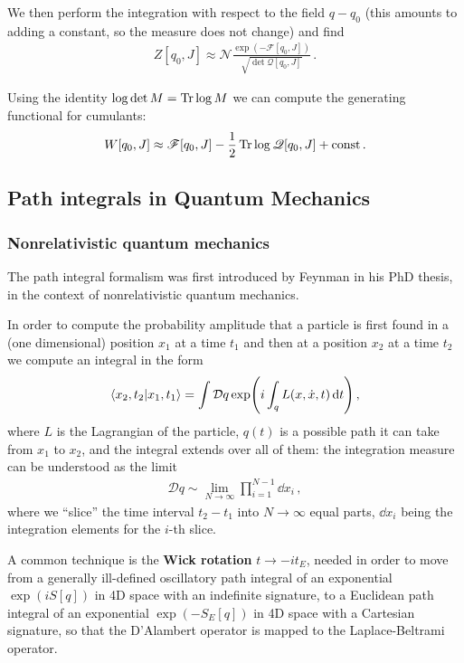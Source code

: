 \documentclass[main.tex]{subfiles}
\begin{document}
We then perform the integration with respect to the field \(q - q_0 \) (this amounts to adding a constant, so the measure does not change) and find 
%
\begin{align}
Z[q_0 , J] \approx \mathscr{N}\frac{\exp(- \mathscr{F}[q_0, J ])}{\sqrt{\det \mathscr{Q} [q_0, J]}}
\,.
\end{align}

Using the identity \(\log \det M = \Tr \log M\) we can compute the generating functional for cumulants:
%
\begin{align}
W[q_0 , J] \approx \mathscr{F}[q_0 , J] - \frac{1}{2} \Tr \log \mathscr{Q}[q_0, J] + \text{const}
\,.
\end{align}

\subsection{Path integrals in Quantum Mechanics}

\subsubsection{Nonrelativistic quantum mechanics}

The path integral formalism was first introduced by Feynman in his PhD thesis, in the context of nonrelativistic quantum mechanics. 

In order to compute the probability amplitude that a particle is first found in a (one dimensional) position \(x_1 \) at a time \(t_1 \) and then at a position \(x_2 \) at a time \(t_2 \) we compute an integral in the form 
%
\begin{align}
\braket{x_2 , t_2 }{x_1 , t_1  } 
= \int \mathcal{D}q \exp( i \int_q L (x, \dot{x}
, t) \dd{t})
\,,
\end{align}
%
where \(L\) is the Lagrangian of the particle, \(q (t)\) is a possible path it can take from \(x_1 \) to \(x_2 \), and the integral extends over all of them: the integration measure can be understood as the limit
%
\begin{align}
\mathcal{D}q \sim \lim_{N \to \infty } \prod_{i=1}^{N-1} \dd{x_i}
\,,
\end{align}
%
where we ``slice'' the time interval \(t_2 - t_1 \) into \(N \to \infty \) equal parts, \(\dd{x_i}\) being the integration elements for the \(i\)-th slice. 

A common technique is the \textbf{Wick rotation} \(t \to -i t_E\), needed in order to move from a generally ill-defined oscillatory path integral of an exponential \(\exp(i S[q])\) in 4D space with an indefinite signature, to a Euclidean path integral of an exponential \(\exp(- S_E[q])\) in 4D space with a Cartesian signature, so that the D'Alambert operator is mapped to the Laplace-Beltrami operator.
\end{document}
